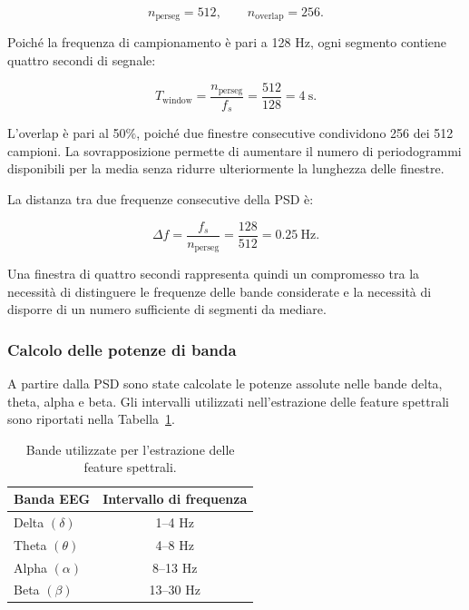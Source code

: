 \begin{equation}
	n_{\mathrm{perseg}}=512,
	\qquad
	n_{\mathrm{overlap}}=256.
\end{equation}

Poiché la frequenza di campionamento è pari a 128 Hz, ogni segmento
contiene quattro secondi di segnale:

\begin{equation}
	T_{\mathrm{window}}
	=
	\frac{n_{\mathrm{perseg}}}{f_s}
	=
	\frac{512}{128}
	=
	4\ \mathrm{s}.
\end{equation}

L'overlap è pari al 50$\%$, poiché due finestre consecutive condividono
256 dei 512 campioni. La sovrapposizione permette di aumentare il
numero di periodogrammi disponibili per la media senza ridurre
ulteriormente la lunghezza delle finestre.

La distanza tra due frequenze consecutive della PSD è:

\begin{equation}
	\Delta f
	=
	\frac{f_s}{n_{\mathrm{perseg}}}
	=
	\frac{128}{512}
	=
	0.25\ \mathrm{Hz}.
\end{equation}

Una finestra di quattro secondi rappresenta quindi un compromesso tra
la necessità di distinguere le frequenze delle bande considerate e la
necessità di disporre di un numero sufficiente di segmenti da mediare.


\subsubsection{Calcolo delle potenze di banda}

A partire dalla PSD sono state calcolate le potenze assolute nelle
bande delta, theta, alpha e beta. Gli intervalli utilizzati
nell'estrazione delle feature spettrali sono riportati nella
Tabella~\ref{tab:eeg_bands}.

\begin{table}[H]
	\centering
	\begin{tabular}{lc}
		\hline
		\textbf{Banda EEG} & \textbf{Intervallo di frequenza} \\
		\hline
		Delta $(\delta)$ & 1--4 Hz \\
		Theta $(\theta)$ & 4--8 Hz \\
		Alpha $(\alpha)$ & 8--13 Hz \\
		Beta $(\beta)$ & 13--30 Hz \\
		\hline
	\end{tabular}
	\caption{Bande utilizzate per l'estrazione delle feature
		spettrali.}
	\label{tab:eeg_bands}
\end{table}


